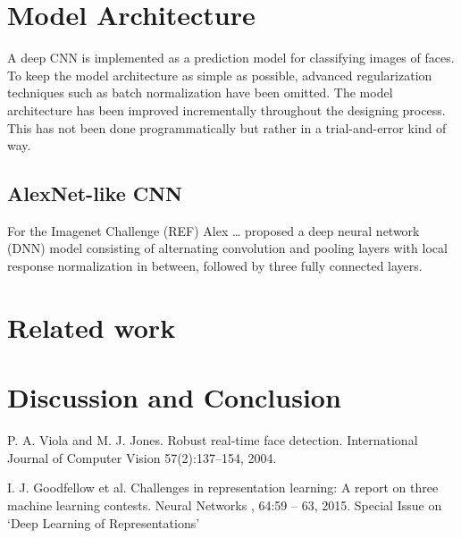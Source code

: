 \documentclass[twoside]{article}
\begin{document}
\begin{multicols}{2}

\section{Model Architecture}
A deep CNN is implemented as a prediction model for classifying images of faces. To keep the model architecture as simple as possible, advanced regularization techniques such as batch normalization have been omitted. The model architecture has been improved incrementally throughout the designing process. This has not been done programmatically but rather in a trial-and-error kind of way.

\subsection{AlexNet-like CNN}
For the Imagenet Challenge (REF) Alex … proposed a deep neural network (DNN) model consisting of alternating convolution and pooling layers with local response normalization in between, followed by three fully connected layers. 


\section{Related work}



\section{Discussion and Conclusion}





\begin{thebibliography}{9}

  	P. A. Viola and M. J. Jones. Robust real-time face detection.
	International Journal of Computer Vision
	57(2):137–154, 2004.

	I. J. Goodfellow et al.
	Challenges in representation learning: A report on three machine
	learning contests.
	Neural Networks
	, 64:59 – 63, 2015.
	Special Issue on ‘Deep Learning of Representations’
	

\end{thebibliography}
\end{multicols}
\end{document}
